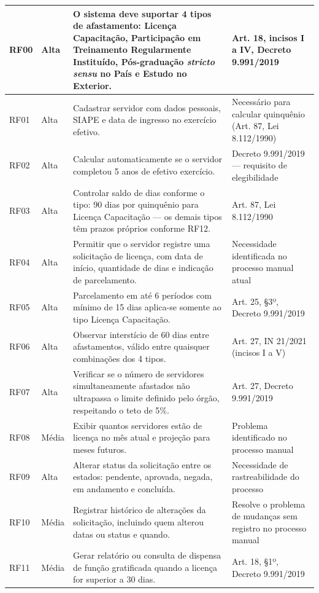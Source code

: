 \begin{longtable}{|p{1.8cm}|p{1.8cm}|p{6.5cm}|p{4cm}|}
RF00 & Alta & O sistema deve suportar 4 tipos de afastamento: Licença Capacitação, Participação em Treinamento Regularmente Instituído, Pós-graduação \textit{stricto sensu} no País e Estudo no Exterior. & Art. 18, incisos I a IV, Decreto 9.991/2019 \\ \hline
RF01 & Alta & Cadastrar servidor com dados pessoais, SIAPE e data de ingresso no exercício efetivo. & Necessário para calcular quinquênio (Art. 87, Lei 8.112/1990) \\ \hline
RF02 & Alta & Calcular automaticamente se o servidor completou 5 anos de efetivo exercício. & Decreto 9.991/2019 — requisito de elegibilidade \\ \hline
RF03 & Alta & Controlar saldo de dias conforme o tipo: 90 dias por quinquênio para Licença Capacitação — os demais tipos têm prazos próprios conforme RF12. & Art. 87, Lei 8.112/1990 \\ \hline
RF04 & Alta & Permitir que o servidor registre uma solicitação de licença, com data de início, quantidade de dias e indicação de parcelamento. & Necessidade identificada no processo manual atual \\ \hline
RF05 & Alta & Parcelamento em até 6 períodos com mínimo de 15 dias aplica-se somente ao tipo Licença Capacitação. & Art. 25, §3º, Decreto 9.991/2019 \\ \hline
RF06 & Alta & Observar interstício de 60 dias entre afastamentos, válido entre quaisquer combinações dos 4 tipos. & Art. 27, IN 21/2021 (incisos I a V) \\ \hline
RF07 & Alta & Verificar se o número de servidores simultaneamente afastados não ultrapassa o limite definido pelo órgão, respeitando o teto de 5\%. & Art. 27, Decreto 9.991/2019 \\ \hline
RF08 & Média & Exibir quantos servidores estão de licença no mês atual e projeção para meses futuros. & Problema identificado no processo manual \\ \hline
RF09 & Alta & Alterar status da solicitação entre os estados: pendente, aprovada, negada, em andamento e concluída. & Necessidade de rastreabilidade do processo \\ \hline
RF10 & Média & Registrar histórico de alterações da solicitação, incluindo quem alterou datas ou status e quando. & Resolve o problema de mudanças sem registro no processo manual \\ \hline
RF11 & Média & Gerar relatório ou consulta de dispensa de função gratificada quando a licença for superior a 30 dias. & Art. 18, §1º, Decreto 9.991/2019 \\ \hline

\end{longtable}
